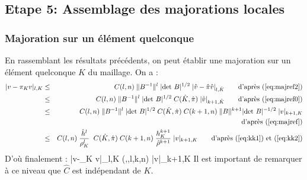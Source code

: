 \subsection{Etape 5: Assemblage des majorations locales}
%
%
\subsubsection{Majoration sur un \'el\'ement quelconque}
%
\noindent
%
En rassemblant les r\'esultats pr\'ec\'edents, on peut \'etablir une majoration sur un \'el\'ement quelconque $K$ du maillage. On a :
%
\begin{eqnarray*}
|v-\pi_K v|_{l,K} & \le & C(l,n)\; \|B^{-1}\|^l\; |\hbox{det }B|^{1/2} \; |\hat{v}-\hat{\pi}\hat{v}|_{l,\hat{K}}\qquad\hbox{d'apr\`es (\ref{eq:majref2})} \\
 & \le & C(l,n)\; \|B^{-1}\|^l\; |\hbox{det }B|^{1/2} \; C(\hat{K},\hat{\pi})\; |\hat{v}|_{k+1,\hat{K}} \qquad\hbox{d'apr\`es (\ref{eq:majref0})}\\
& \le & C(l,n)\; \|B^{-1}\|^l\; |\hbox{det }B|^{1/2} \; C(\hat{K},\hat{\pi})\; C(k+1,n) \; \|B\|^{k+1} |\hbox{det }B|^{-1/2}\; |v|_{k+1,K}\\
& & \qquad\qquad\qquad\qquad\hbox{d'apr\`es (\ref{eq:majref})}\\
& \le & C(l,n)\; \frac{\hat{h}^l}{\rho_K^l} \;  \; C(\hat{K},\hat{\pi})\; C(k+1,n) \; \frac{h_K^{k+1}}{\hat{\rho}^{k+1}} \; |v|_{k+1,K} \qquad\hbox{d'apr\`es (\ref{eq:kk1}) et (\ref{eq:kk2})}\\
 \end{eqnarray*}
%
D'o\`u finalement :
\be
|v-\pi_K v|_{l,K}  \le  {}(\hat{\pi},,l,k,n)\;  \;   |v|_{k+1,K}
\label{eq:majloc}
\ee
%
Il est important de remarquer \`a ce niveau que $\hat{C}$ est ind\'ependant de $K$.
%
%

